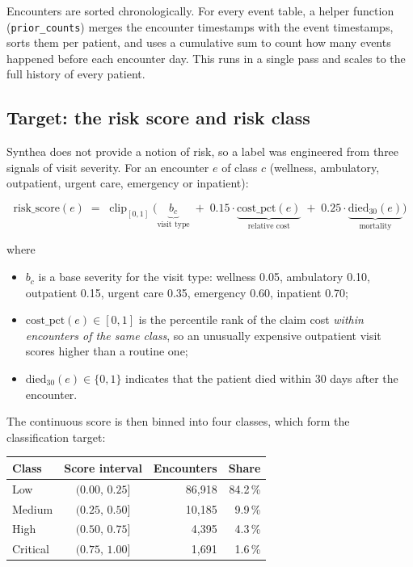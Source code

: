 \documentclass[11pt,a4paper]{article}
\newcommand{\code}[1]{\texttt{\textcolor{codegrey}{#1}}}
\begin{document}
Encounters are sorted chronologically. For every event table, a helper function
(\code{prior\_counts}) merges the encounter timestamps with the event timestamps, sorts them per
patient, and uses a cumulative sum to count how many events happened before each encounter day.
This runs in a single pass and scales to the full history of every patient.

\subsection{Target: the risk score and risk class}

Synthea does not provide a notion of risk, so a label was engineered from three signals of visit
severity. For an encounter $e$ of class $c$ (wellness, ambulatory, outpatient, urgent care,
emergency or inpatient):

\begin{equation}
  \text{risk\_score}(e) \;=\; \operatorname{clip}_{[0,1]}\Big(
     \underbrace{b_c}_{\text{visit type}}
     \;+\; 0.15 \cdot \underbrace{\text{cost\_pct}(e)}_{\text{relative cost}}
     \;+\; 0.25 \cdot \underbrace{\text{died}_{30}(e)}_{\text{mortality}}
  \Big)
  \label{eq:score}
\end{equation}

\noindent where
\begin{itemize}[itemsep=2pt]
  \item $b_c$ is a base severity for the visit type:
        wellness 0.05, ambulatory 0.10, outpatient 0.15, urgent care 0.35, emergency 0.60,
        inpatient 0.70;
  \item $\text{cost\_pct}(e) \in [0,1]$ is the percentile rank of the claim cost
        \emph{within encounters of the same class}, so an unusually expensive outpatient visit
        scores higher than a routine one;
  \item $\text{died}_{30}(e) \in \{0,1\}$ indicates that the patient died within 30 days after the
        encounter.
\end{itemize}

The continuous score is then binned into four classes, which form the classification target:

\begin{center}\small
\begin{tabular}{@{}lcrr@{}}
\toprule
\textbf{Class} & \textbf{Score interval} & \textbf{Encounters} & \textbf{Share} \\
\midrule
Low      & $(0.00,\,0.25]$ & 86{,}918 & 84.2\,\% \\
Medium   & $(0.25,\,0.50]$ & 10{,}185 &  9.9\,\% \\
High     & $(0.50,\,0.75]$ &  4{,}395 &  4.3\,\% \\
Critical & $(0.75,\,1.00]$ &  1{,}691 &  1.6\,\% \\
\bottomrule
\end{tabular}
\end{center}
\end{document}
